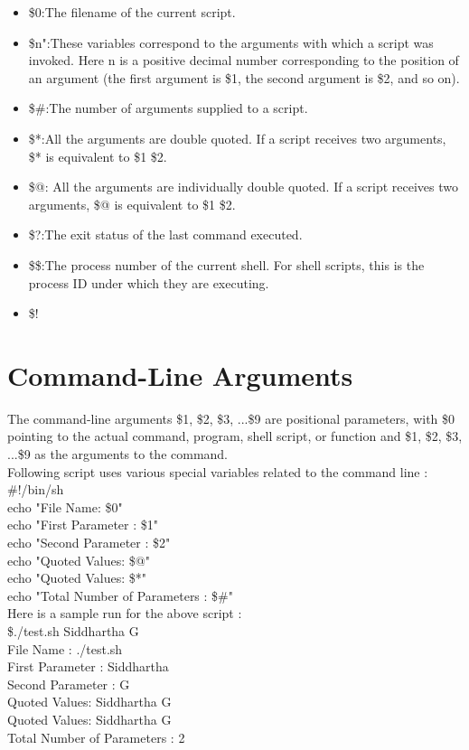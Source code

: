 \documentclass{article}
\begin{document}
\begin{itemize}
    \item \$0:The filename of the current script.
    \item \$n":These variables correspond to the arguments with which a script was invoked. Here n is a positive decimal number corresponding to the position of an argument (the first argument is \$1, the second argument is \$2, and so on).
    \item \$\#:The number of arguments supplied to a script.\\
    \item \$*:All the arguments are double quoted. If a script receives two arguments, \$* is equivalent to \$1 \$2.\\
    \item \$@: All the arguments are individually double quoted. If a script receives two arguments, \$@ is equivalent to \$1 \$2.\\
    \item \$?:The exit status of the last command executed.\\
    \item \$\$:The process number of the current shell. For shell scripts, this is the process ID under which they are executing.\\
    \item \$!
\end{itemize}

\section*{Command-Line Arguments}
The command-line arguments \$1, \$2, \$3, ...\$9 are positional parameters, with \$0 pointing to the actual command, program, shell script, or function and \$1, \$2, \$3, ...\$9 as the arguments to the command.\\
Following script uses various special variables related to the command line :\\
\#!/bin/sh\\
echo "File Name: \$0"\\
echo "First Parameter : \$1"\\
echo "Second Parameter : \$2"\\
echo "Quoted Values: \$@"\\
echo "Quoted Values: \$*"\\
echo "Total Number of Parameters : \$#"\\
Here is a sample run for the above script :\\
\$./test.sh Siddhartha G\\
File Name : ./test.sh\\
First Parameter : Siddhartha\\
Second Parameter : G\\
Quoted Values: Siddhartha G\\
Quoted Values: Siddhartha G\\
Total Number of Parameters : 2\\
\end{document}
